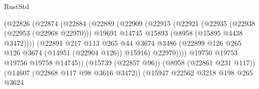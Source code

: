 \begin{lexlean}{RustStd}
\begin{coremodule}
                                          (@22826
                                            (@22874
                                              (@22884
                                                (@22889
                                                  (@22909
                                                    (@22915
                                                      (@22921
                                                        (@22935
                                                          (@22938 (@22953 (@22968 @22970)))
                                                          @19691
                                                          @14745
                                                          @15893
                                                          (@8958 (@15895 @4438 @3472))))
                                                      (@22891
                                                        @217
                                                        @113
                                                        @265
                                                        @44
                                                        @3674
                                                        @3486
                                                        (@22899
                                                          @126
                                                          @265
                                                          @126
                                                          @3674
                                                          (@14951 (@22904 @126))
                                                          @15916)
                                                        @22970))))
                                                @19750
                                                @19753
                                                @19756
                                                @19758
                                                @14745))
                                            (@15739 (@22857 @96))
                                            (@8958 (@22861 @231 @117))
                                            (@14607 (@22868 @117 @98 @3616 @3472))
                                            (@15947
                                              @22562
                                              @3218
                                              @198
                                              @265
                                              @3624

\end{coremodule}
\end{lexlean}

